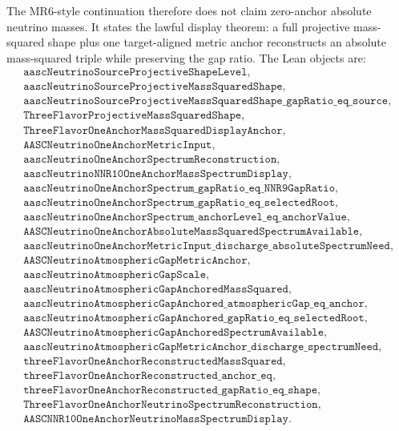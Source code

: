 \documentclass[11pt]{article}
\begin{document}
The MR6-style continuation therefore does not claim zero-anchor absolute
neutrino masses.  It states the lawful display theorem: a full projective
mass-squared shape plus one target-aligned metric anchor reconstructs an
absolute mass-squared triple while preserving the gap ratio.  The Lean objects
are:
\[
\begin{array}{ll}
\texttt{aascNeutrinoSourceProjectiveShapeLevel},\\
\texttt{aascNeutrinoSourceProjectiveMassSquaredShape},\\
\texttt{aascNeutrinoSourceProjectiveMassSquaredShape\_gapRatio\_eq\_source},\\
\texttt{ThreeFlavorProjectiveMassSquaredShape},\\
\texttt{ThreeFlavorOneAnchorMassSquaredDisplayAnchor},\\
\texttt{AASCNeutrinoOneAnchorMetricInput},\\
\texttt{aascNeutrinoOneAnchorSpectrumReconstruction},\\
\texttt{aascNeutrinoNNR10OneAnchorMassSpectrumDisplay},\\
\texttt{aascNeutrinoOneAnchorSpectrum\_gapRatio\_eq\_NNR9GapRatio},\\
\texttt{aascNeutrinoOneAnchorSpectrum\_gapRatio\_eq\_selectedRoot},\\
\texttt{aascNeutrinoOneAnchorSpectrum\_anchorLevel\_eq\_anchorValue},\\
\texttt{AASCNeutrinoOneAnchorAbsoluteMassSquaredSpectrumAvailable},\\
\texttt{aascNeutrinoOneAnchorMetricInput\_discharge\_absoluteSpectrumNeed},\\
\texttt{AASCNeutrinoAtmosphericGapMetricAnchor},\\
\texttt{aascNeutrinoAtmosphericGapScale},\\
\texttt{aascNeutrinoAtmosphericGapAnchoredMassSquared},\\
\texttt{aascNeutrinoAtmosphericGapAnchored\_atmosphericGap\_eq\_anchor},\\
\texttt{aascNeutrinoAtmosphericGapAnchored\_gapRatio\_eq\_selectedRoot},\\
\texttt{AASCNeutrinoAtmosphericGapAnchoredSpectrumAvailable},\\
\texttt{aascNeutrinoAtmosphericGapMetricAnchor\_discharge\_spectrumNeed},\\
\texttt{threeFlavorOneAnchorReconstructedMassSquared},\\
\texttt{threeFlavorOneAnchorReconstructed\_anchor\_eq},\\
\texttt{threeFlavorOneAnchorReconstructed\_gapRatio\_eq\_shape},\\
\texttt{ThreeFlavorOneAnchorNeutrinoSpectrumReconstruction},\\
\texttt{AASCNNR10OneAnchorNeutrinoMassSpectrumDisplay}.
\end{array}
\]
\end{document}
